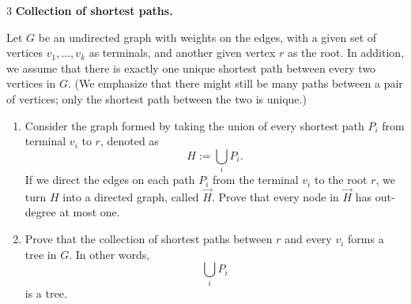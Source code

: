 \documentclass[12pt]{article}
\begin{document}
\begin{problem}{3} \textbf{Collection of shortest paths.}

    Let $G$ be an undirected graph with weights on the edges, with a given set of vertices $v_1, \dots, v_k$ as terminals, and another given vertex $r$ as the root. In addition, we assume that there is exactly one unique shortest path between every two vertices in $G$. (We emphasize that there might still be many paths between a pair of vertices; only the shortest path between the two is unique.)

    \begin{enumerate}
        \item[(a)] Consider the graph formed by taking the union of every shortest path $P_i$ from terminal $v_i$ to $r$, denoted as 
        \[
        H := \bigcup_i P_i.
        \]
        If we direct the edges on each path $P_i$ from the terminal $v_i$ to the root $r$, we turn $H$ into a directed graph, called $\vec{H}$. Prove that every node in $\vec{H}$ has out-degree at most one.
        
        \item[(b)] Prove that the collection of shortest paths between $r$ and every $v_i$ forms a tree in $G$. In other words,
        \[
        \bigcup_i P_i
        \]
        is a tree.
    \end{enumerate}
\end{problem}
\end{document}
